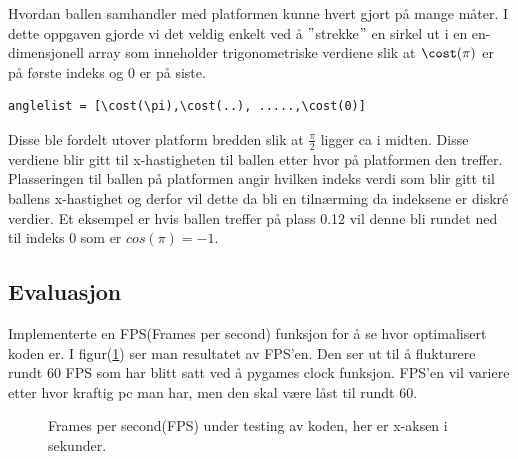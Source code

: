 \documentclass{article}     %
\begin{document}
Hvordan ballen samhandler med platformen kunne hvert gjort på mange måter. I dette oppgaven gjorde vi det veldig enkelt ved å $"$strekke$"$ en sirkel ut i en en-dimensjonell array som inneholder trigonometriske verdiene slik at $\cost(\pi)$ er på første indeks og 0 er på siste.
\begin{lstlisting}
anglelist = [\cost(\pi),\cost(..), .....,\cost(0)]
\end{lstlisting}
Disse ble fordelt utover platform bredden slik at $\frac{\pi}{2}$ ligger ca i midten.
Disse verdiene blir gitt til x-hastigheten til ballen etter hvor på platformen den treffer. Plasseringen til ballen på platformen angir hvilken indeks verdi som blir gitt til ballens x-hastighet og derfor vil dette da bli en tilnærming da indeksene er diskré verdier. Et eksempel er hvis ballen treffer på plass 0.12 vil denne bli rundet ned til indeks 0 som er $cos(\pi) = -1$.


\subsection{Evaluasjon}

Implementerte en FPS(Frames per second) funksjon for å se hvor optimalisert koden er. I figur(\ref{FPS}) ser man resultatet av FPS'en. Den ser ut til å flukturere rundt 60 FPS som har blitt satt ved å pygames clock funksjon. FPS'en vil variere etter hvor kraftig pc man har, men den skal være låst til rundt 60.



\begin{figure}[h!]
\caption{Frames per second(FPS) under testing av koden, her er x-aksen i sekunder.}
\label{FPS}
\end{figure}
\end{document}
